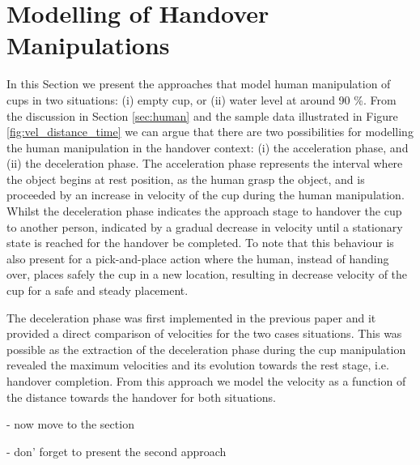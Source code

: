 \section{Modelling of Handover Manipulations}
\label{sec:model}
In this Section we present the approaches that model human manipulation of cups in two situations: (i) empty cup, or (ii) water level at around 90 \%. From the discussion in Section \ref{sec:human} and the sample data illustrated in Figure \ref{fig:vel_distance_time} we can argue that there are two possibilities for modelling the human manipulation in the handover context: (i) the acceleration phase, and (ii) the deceleration phase. The acceleration phase represents the interval where the object begins at rest position, as the human grasp the object, and is proceeded by an increase in velocity of the cup during the human manipulation. Whilst the deceleration phase indicates the approach stage to handover the cup to another person, indicated by a gradual decrease in velocity until a stationary state is reached for the handover be completed.
To note that this behaviour is also present for a pick-and-place action \cite{flash_models_2013} where the human, instead of handing over, places safely the cup in a new location, resulting in decrease velocity of the cup for a safe and steady placement.  

The deceleration phase was first implemented in the previous paper \cite{duarte_human_2020} and it provided a direct comparison of velocities for the two cases situations. This was possible as the extraction of the deceleration phase during the cup manipulation revealed the maximum velocities and its evolution towards the rest stage, i.e. handover completion. From this approach we model the velocity as a function of the distance towards the handover for both situations. 

- now move to the section

- don' forget to present the second approach


